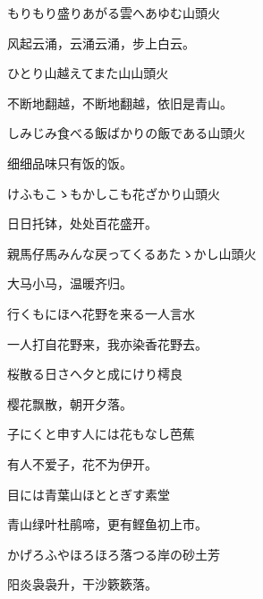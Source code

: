\begin{haiku}
    {\FH もりもり盛りあがる雲へあゆむ}\hfill{\FH 山頭火}

    {\FK 风起云涌，云涌云涌，步上白云。}
\end{haiku}

\begin{haiku}
    {\FH ひとり山越えてまた山}\hfill{\FH 山頭火}

    {\FK 不断地翻越，不断地翻越，依旧是青山。}
\end{haiku}

\begin{haiku}
    {\FH しみじみ食べる飯ばかりの飯である}\hfill{\FH 山頭火}

    {\FK 细细品味只有饭的饭。}
\end{haiku}

\begin{haiku}
    {\FH けふもこゝもかしこも花ざかり}\hfill{\FH 山頭火}

    {\FK 日日托钵，处处百花盛开。}
\end{haiku}

\begin{haiku}
    {\FH 親馬仔馬みんな戻ってくるあたゝかし}\hfill{\FH 山頭火}

    {\FK 大马小马，温暖齐归。}
\end{haiku}

\begin{haiku}
    {\FH 行くもにほへ花野を来る一人}\hfill{\FH 言水}

    {\FK 一人打自花野来，我亦染香花野去。}
\end{haiku}

\begin{haiku}
    {\FH 桜散る日さへ夕と成にけり}\hfill{\FH 樗良}

    {\FK 樱花飘散，朝开夕落。}
\end{haiku}

\begin{haiku}
    {\FH 子にくと申す人には花もなし}\hfill{\FH 芭蕉}

    {\FK 有人不爱子，花不为伊开。}
\end{haiku}

\begin{haiku}
    {\FH 目には青葉山ほととぎす}\hfill{\FH 素堂}

    {\FK 青山绿叶杜鹃啼，更有鲣鱼初上市。}
\end{haiku}

\begin{haiku}
    {\FH かげろふやほろほろ落つる岸の砂}\hfill{\FH 土芳}

    {\FK 阳炎袅袅升，干沙簌簌落。}
\end{haiku}

